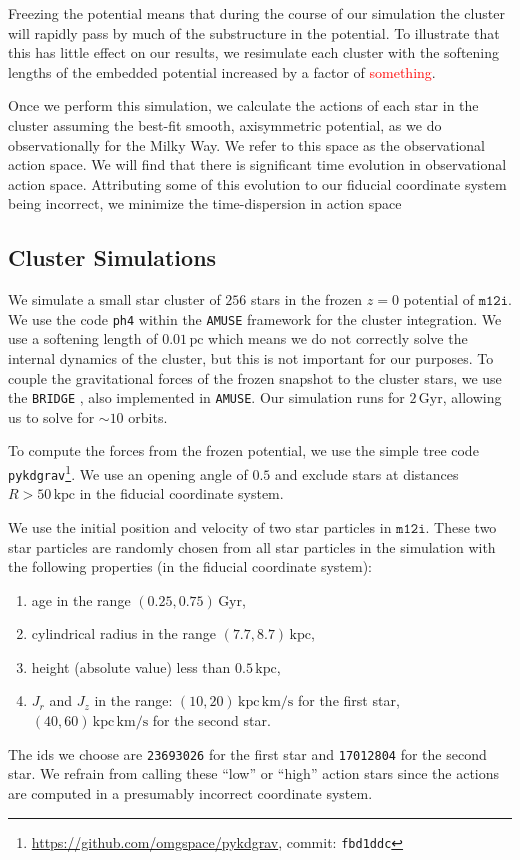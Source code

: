\documentclass[twocolumn]{aastex62}
\newcommand{\Gus}[1]{\textcolor{red}{#1}}
\newcommand{\pc}{\text{pc}}
\newcommand{\kpc}{\text{kpc}}
\newcommand{\Gyr}{\text{Gyr}}
\newcommand{\kms}{\text{km}/\text{s}}
\newcommand{\actunit}{\text{kpc}\,\kms}
\newcommand{\z}{z}
\begin{document}
Freezing the potential means that during the course of our simulation the
cluster will rapidly pass by much of the substructure in the potential. To
illustrate that this has little effect on our results, we resimulate each
cluster with the softening lengths of the embedded potential increased by a
factor of \Gus{something}.

Once we perform this simulation, we calculate the actions of each star in the
cluster assuming the best-fit smooth, axisymmetric potential, as we do
observationally for the Milky Way. We refer to this space as the observational
action space. We will find that there is significant time evolution in
observational action space. Attributing some of this evolution to our fiducial
coordinate system being incorrect, we minimize the time-dispersion in action
space

\subsection{Cluster Simulations} \label{ssec:cluster_sim}
We simulate a small star cluster of $256$ stars in the frozen $\z=0$
potential of $\texttt{m12i}$. We use the code \texttt{ph4} within the
\texttt{AMUSE} framework \citep{2011ascl.soft07007P, 2013CoPhC.184..456P,
2013A&A...557A..84P} for the cluster integration. We use a softening length
of $0.01\,\pc$ which means we do not correctly solve the internal dynamics of
the cluster, but this is not important for our purposes. To couple the
gravitational forces of the frozen snapshot to the cluster stars, we use the
\texttt{BRIDGE} \citep{2007PASJ...59.1095F}, also implemented in
\texttt{AMUSE}. Our simulation runs for $2\,\Gyr$, allowing us to solve for
$\sim 10$ orbits.

To compute the forces from the frozen potential, we use the simple tree code
\texttt{pykdgrav}\footnote{\url{https://github.com/omgspace/pykdgrav},
commit: \texttt{fbd1ddc}}. We use an opening angle of $0.5$ and exclude stars
at distances $R>50\,\kpc$ in the fiducial coordinate system.

We use the initial position and velocity of two star particles in
$\texttt{m12i}$. These two star particles are randomly chosen from all star
particles in the simulation with the following properties (in the fiducial
coordinate system):
\begin{enumerate}
    \item age in the range $(0.25, 0.75)\,\Gyr$,
    \item cylindrical radius in the range $(7.7, 8.7)\,\kpc$,
    \item height (absolute value) less than $0.5\,\kpc$,
    \item $J_r$ and $J_z$ in the range:
        \subitem $(10, 20)\,\actunit$ for the first star,
        \subitem $(40, 60)\,\actunit$ for the second star.
\end{enumerate}
The ids we choose are \texttt{23693026} for the first star and
\texttt{17012804} for the second star. We refrain from calling these ``low''
or ``high'' action stars since the actions are computed in a presumably
incorrect coordinate system.
\end{document}
